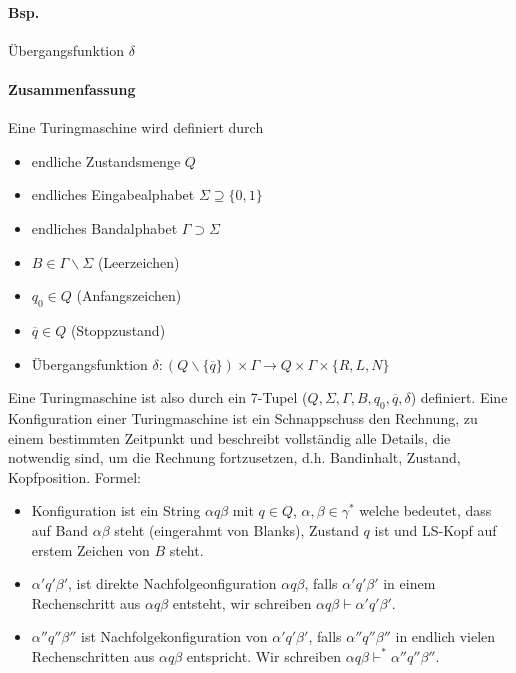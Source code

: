 \paragraph*{Bsp.} Übergangsfunktion $\delta$ %

\paragraph*{Zusammenfassung} Eine Turingmaschine wird definiert durch
\begin{itemize}
	\item endliche Zustandsmenge $Q$
	\item endliches Eingabealphabet $\Sigma \supseteq \{ 0,1 \}$
	\item endliches Bandalphabet $\Gamma \supset \Sigma$
	\item $B \in \Gamma\backslash\Sigma$ (Leerzeichen)
	\item $q_0 \in Q$ (Anfangszeichen)
	\item $\overline{q} \in Q$ (Stoppzustand)
	\item Übergangsfunktion $\delta : (Q \backslash \{ \overline{q} \}) \times \Gamma \rightarrow Q \times \Gamma \times \{ R,L,N \}$
\end{itemize}

\par\medskip
Eine Turingmaschine ist also durch ein 7-Tupel ($Q,\Sigma,\Gamma,B,q_0,\overline{q},\delta$) definiert. Eine Konfiguration einer Turingmaschine ist ein Schnappschuss den Rechnung, zu einem bestimmten Zeitpunkt und beschreibt vollständig alle Details, die notwendig sind, um die Rechnung fortzusetzen, d.h. Bandinhalt, Zustand, Kopfposition. Formel:
\par\medskip
\begin{itemize}
	\item Konfiguration ist ein String $\alpha q \beta$ mit $q \in Q$, $\alpha,\beta \in \gamma^*$ welche bedeutet, dass auf Band $\alpha\beta$ steht (eingerahmt von Blanks), Zustand $q$ ist und LS-Kopf auf erstem Zeichen von $B$ steht.
	\item $\alpha'q'\beta'$, ist direkte Nachfolgeonfiguration $\alpha q \beta$, falls $\alpha'q'\beta'$ in einem Rechenschritt aus $\alpha q \beta$ entsteht, wir schreiben $\alpha q \beta \vdash \alpha'q'\beta'$.
	\item $\alpha''q''\beta''$ ist Nachfolgekonfiguration von $\alpha'q'\beta'$, falls $\alpha''q''\beta''$ in endlich vielen Rechenschritten aus $\alpha q \beta$ entspricht. Wir schreiben $\alpha q \beta \vdash^* \alpha''q''\beta''$.
\end{itemize}

